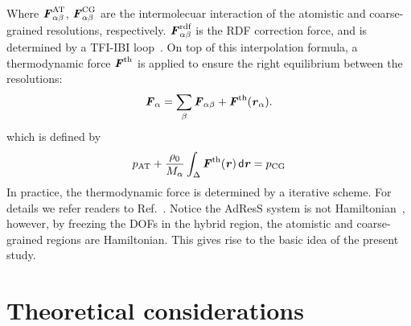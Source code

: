 \documentclass[aip,jcp,a4paper,reprint,onecolumn]{revtex4-1}
\newcommand{\vect}[1]{\textbf{\textit{#1}}}
\newcommand{\dd}[1]{\textsf{#1}}
\newcommand{\AT}{{\textrm{{AT}}}}
\newcommand{\CG}{{\textrm{CG}}}
\newcommand{\rdf}{{\textrm{rdf}}}
\begin{document}
Where $ \vect F^{\AT}_{\alpha\beta}$, $ \vect F^{\CG}_{\alpha\beta}$
are the intermolecuar interaction of the atomistic and coarse-grained
resolutions, respectively.  $\vect F_{\alpha\beta}^{\rdf}$ is the RDF
correction force, and is determined by a TFI-IBI
loop~\cite{rdfcorr}. On top of this interpolation formula, a
thermodynamic force ${\vect F}^{\textrm{th}}$ is applied to ensure the
right equilibrium between the resolutions:
\begin{equation}
  {\vect F}_{\alpha}=
  \sum_{\beta}{\vect F}_{\alpha\beta}+
  {\vect F}^{\textrm{th}}(\vect r_\alpha).
\label{mody}
\end{equation}
which is defined by
\begin{equation}
  p_{\AT}+
  \frac{\rho_{0}}{M_\alpha}
  \int_{\Delta} {\vect F}^\text{th}(\vect r)\,\dd d\vect r
  =p_{\CG}
  \label{thf}
\end{equation}
In practice, the thermodynamic force is determined by a iterative
scheme.  For details we refer readers to Ref.~\cite{prlgc}. Notice the
AdResS system is not Hamiltonian~\cite{presolo,prlcomm}, however, by
freezing the DOFs in the hybrid region, the atomistic and
coarse-grained regions are Hamiltonian. This gives rise to the basic
idea of the present study.

\section{Theoretical considerations}
\end{document}
